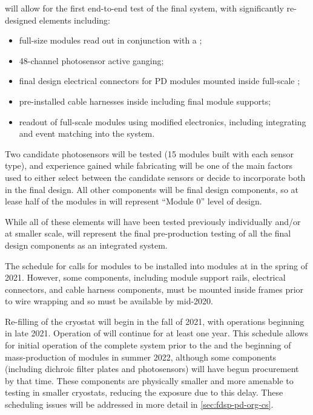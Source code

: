  will allow for the first end-to-end test of the final  system, with significantly re-designed elements including:
\begin{itemize}
    \item full-size  modules read out in conjunction with a ;
    \item \num{48}-channel photosensor active ganging;
    \item final design electrical connectors for PD modules mounted inside full-scale ;
    \item pre-installed cable harnesses inside  including final module supports;
    \item readout of full-scale  modules using modified  electronics, including integrating  and  event matching into the  system.
\end{itemize}

Two candidate photosensors will be tested (\num{15} modules built with each sensor type), and experience gained while fabricating  will be one of the main factors used to either select between the candidate sensors or decide to incorporate both in the  final design.  All other components will be final design components, so at lease half of the  modules in  will represent ``Module 0'' level of design. 


While all of these elements will have been tested previously individually and/or at smaller scale,  will represent the final pre-production testing of all the final design components as an integrated system.

The schedule for  calls for  modules to be installed into  modules at  in the spring of 2021. However, some components, including module support rails, electrical connectors, and cable harness components, must be mounted inside  frames prior to wire wrapping and so must be available by mid-2020.

Re-filling of the  cryostat will begin in the fall of 2021, with operations beginning in late 2021.  Operation of  will continue for at least one year.  This schedule allows for initial operation of the complete system prior to the   and the beginning of mass-production of  modules in summer 2022, although some components (including dichroic filter plates and photosensors) will have begun procurement by that time.  These components are physically smaller and more amenable to testing in smaller cryostats, reducing the exposure due to this delay.  These scheduling issues will be addressed in more detail in \ref{sec:fdsp-pd-org-cs}.

